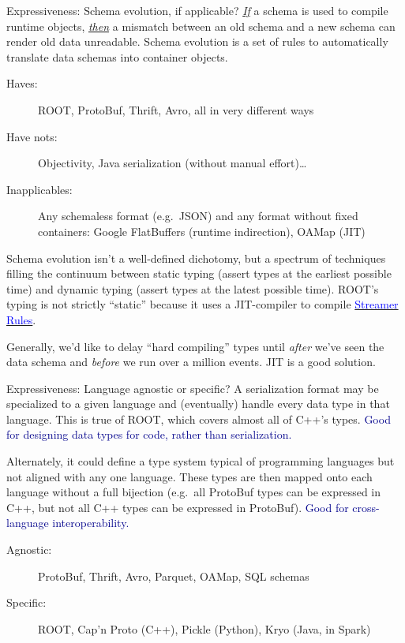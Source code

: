 \documentclass[aspectratio=169]{beamer}
\begin{document}
\begin{frame}{Expressiveness: Schema evolution, if applicable?}
\vspace{0.5 cm}
\underline{\it If} a schema is used to compile runtime objects, \underline{\it then} a mismatch between an old schema and a new schema can render old data unreadable. Schema evolution is a set of rules to automatically translate data schemas into container objects.

\begin{description}
\item[Haves:] ROOT, ProtoBuf, Thrift, Avro, all in very different ways
\item[Have nots:] Objectivity, Java serialization (without manual effort)\ldots
\item[Inapplicables:] Any schemaless format (e.g.\ JSON) and any format without fixed containers: Google FlatBuffers (runtime indirection), OAMap (JIT)
\end{description}

\vspace{0.25 cm}

Schema evolution isn't a well-defined dichotomy, but a spectrum of techniques filling the continuum between static typing (assert types at the earliest possible time) and dynamic typing (assert types at the latest possible time). ROOT's typing is not strictly ``static'' because it uses a JIT-compiler to compile \href{https://root.cern.ch/root/SchemaEvolution.pdf}{\textcolor{blue}{Streamer Rules}}.

\vspace{0.25 cm}

Generally, we'd like to delay ``hard compiling'' types until {\it after} we've seen the data schema and {\it before} we run over a million events. JIT is a good solution.

\end{frame}

\begin{frame}{Expressiveness: Language agnostic or specific?}
\vspace{0.5 cm}
A serialization format may be specialized to a given language and (eventually) handle every data type in that language. This is true of ROOT, which covers almost all of C++'s types. \textcolor{darkblue}{Good for designing data types for code, rather than serialization.}

\vfill

Alternately, it could define a type system typical of programming languages but not aligned with any one language. These types are then mapped onto each language without a full bijection (e.g.\ all ProtoBuf types can be expressed in C++, but not all C++ types can be expressed in ProtoBuf). \textcolor{darkblue}{Good for cross-language interoperability.}

\vfill

\begin{description}
\item[Agnostic:] ProtoBuf, Thrift, Avro, Parquet, OAMap, SQL schemas
\item[Specific:] ROOT, Cap'n Proto (C++), Pickle (Python), Kryo (Java, in Spark)
\end{description}
\end{frame}
\end{document}
